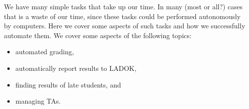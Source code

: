 
We have many simple tasks that take up our time.
In many (most or all?) cases that is a waste of our time, since these tasks 
could be performed autonomously by computers.
Here we cover some aspects of such tasks and how we successfully automate them.
We cover some aspects of the following topics:
\begin{itemize}
  \item automated grading,
  \item automatically report results to LADOK,
  \item finding results of late students, and
  \item managing TAs.
\end{itemize}

\endinput

In terms of grading we cover the following aspects:
\begin{itemize}
  \item \alert<2>{Reporting to Canvas when connected to automated grading (\eg 
    gits-15, Kattis, mail, zoom participation \etc)}
  \item \alert<2>{Grading/commenting assignments}
\end{itemize}

  \begin{example}[Reporting]
    \begin{itemize}
      \item \alert<2>{Bulk reporting}
      \item \alert<2>{Formulas for grading}
      \item \alert<2>{Canvas to LADOK with correct dates}
      \item \alert<2>{Automated grading + reporting}
    \end{itemize}
  \end{example}

